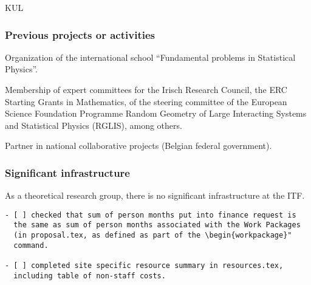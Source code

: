 \begin{sitedescription}{KUL}
\subsubsection*{Previous projects or activities}

\begin{compactenum}
\item Organization of the international school ``Fundamental problems in Statistical
Physics''.
\item Membership of expert committees for the Irisch Research Council, the ERC Starting
Grants in Mathematics, of the steering committee of the European Science Foundation
Programme Random Geometry of Large Interacting Systems and Statistical Physics (RGLIS),
among others.
\item Partner in national collaborative projects (Belgian federal government).
\end{compactenum}

\subsubsection*{Significant infrastructure}

As a theoretical research group, there is no significant infrastructure at the ITF.

\end{sitedescription}



\begin{draft}
\vspace{1cm}

\begin{verbatim}
- [ ] checked that sum of person months put into finance request is
  the same as sum of person months associated with the Work Packages
  (in proposal.tex, as defined as part of the \begin{workpackage}"
  command.
  
- [ ] completed site specific resource summary in resources.tex,
  including table of non-staff costs.

\end{verbatim}
\end{draft}


